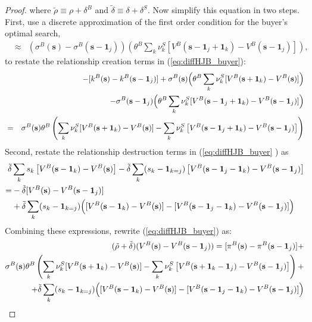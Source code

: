 \documentclass[12pt]{article} \usepackage{amsmath,amssymb,amsthm,geometry,graphicx,setspace,algorithm,algpseudocode,float}
\begin{document}
\begin{proof}
where $\tilde{\rho} \equiv \rho + \delta^B$ and $\tilde{\delta} \equiv
\delta+\delta^S$. Now simplify this equation in two steps. First, use a
discrete approximation of the first order condition for the buyer's optimal
search, 
\begin{eqnarray*}
[k^{B}(\mathbf{s})-k^{B}(\mathbf{s}-\mathbf{1}_j)] &\approx &(\sigma ^{B}(%
\mathbf{s})-\sigma ^{B}(\mathbf{s}-\mathbf{1}_j))\left(\theta^{B}\sum_{k}%
\nu_k^S[ V^{B}(\mathbf{s}-\mathbf{1}_j+\mathbf{1}_k)- V^{B}(\mathbf{s}-%
\mathbf{1}_j)]\right),
\end{eqnarray*}
to restate the relationship creation terms in (\ref{eq:diffHJB_buyer}): 
\begin{eqnarray*}
&&-[k^{B}(\mathbf{s})-k^{B}(\mathbf{s}-\mathbf{1}_j)] +\sigma ^{B}(\mathbf{s}%
)\Bigl(\theta^{B}\sum_{k}\nu_k^S[ V^{B}(\mathbf{s}+\mathbf{1}_k)- V^{B}(%
\mathbf{s})]\Bigr) \\
&&-\sigma ^{B}(\mathbf{s}-\mathbf{1}_j)\Bigl(\theta^{B}\sum_{k}\nu_k^S[
V^{B}(\mathbf{s}-\mathbf{1}_j+\mathbf{1}_k)- V^{B}(\mathbf{s}-\mathbf{1}_j)]%
\Bigr) \\
&=&\sigma^B(\mathbf{s})\theta^B\left(\sum_{k}\nu _{k}^{S}[V^{B}(\mathbf{s}+%
\mathbf{1}_k)-V^{B}(\mathbf{s})]-\sum_{k}\nu _{k}^{S}\left[V^{B}(\mathbf{s}-%
\mathbf{1}_j+\mathbf{1}_k)-V^{B}(\mathbf{s}-\mathbf{1}_j)\right]\right)
\end{eqnarray*}
Second, restate the relationship destruction terms in (\ref{eq:diffHJB_buyer}%
) as 
\begin{eqnarray*}
\tilde{\delta} & \sum_{k}s_{k}\left[V^{B}(\mathbf{s}-\mathbf{1}_k)-V^{B}(%
\mathbf{s})\right]-\tilde{\delta}\sum_{k}(s_{k}-\mathbf{1}_{k=j})\left[V^{B}(%
\mathbf{s}-\mathbf{1}_j-\mathbf{1}_k)-V^{B}(\mathbf{s}-\mathbf{1}_j)\right] 
\\
= &-\tilde{\delta}[V^B(\mathbf{s})-V^B(\mathbf{s}-\mathbf{1}_j)]
\\ & +\tilde{\delta}
\sum_{k}(s_{k}-\mathbf{1}_{k=j})\Bigl(\lbrack V^{B}(\mathbf{s}-\mathbf{1}_k)
- V^B(\mathbf{s})]-[V^{B}(\mathbf{s}-\mathbf{1}_j-\mathbf{1}_k)-V^{B}(%
\mathbf{s}-\mathbf{1}_j)]\Bigr)
\end{eqnarray*}
Combining these expressions, rewrite (\ref{eq:diffHJB_buyer}) as: 
\begin{align*}
(\tilde{\rho}+\tilde{\delta})(V^{B}(\mathbf{s})-V^{B}(\mathbf{s}-\mathbf{1}%
_j)) = [\pi ^{B}(\mathbf{s})-\pi ^{B}(\mathbf{s}-\mathbf{1}_j)] + \\
\sigma^B(\mathbf{s})\theta^B\left(\sum_{k}\nu _{k}^{S}[V^{B}(\mathbf{s}+%
\mathbf{1}_k)-V^{B}(\mathbf{s})]-\sum_{k}\nu _{k}^{S}\left[V^{B}(\mathbf{s}+%
\mathbf{1}_k-\mathbf{1}_j)-V^{B}(\mathbf{s}-\mathbf{1}_j)\right]\right)+ \\
+\tilde{\delta} \sum_{k}(s_{k}-\mathbf{1}_{k=j})\Bigl(\lbrack V^{B}(\mathbf{s%
}-\mathbf{1}_k) - V^B(\mathbf{s})]-[V^{B}(\mathbf{s}-\mathbf{1}_j-\mathbf{1}%
_k)-V^{B}(\mathbf{s}-\mathbf{1}_j)]\Bigr)
\end{align*}


\end{proof}
\end{document}
